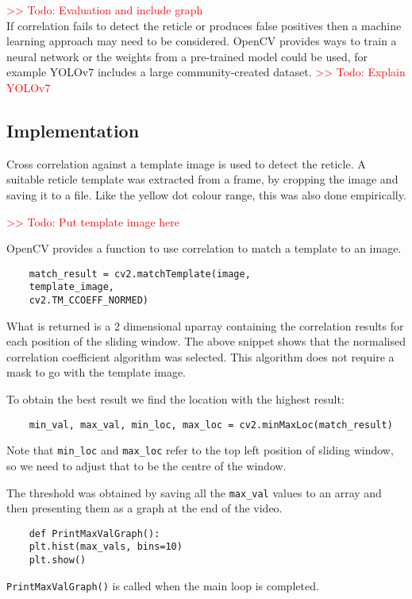 \documentclass[final]{cmpreport_02}
\begin{document}
\noindent
\textcolor{red}{>> Todo: Evaluation and include graph}\\
If correlation fails to detect the reticle or produces false positives then a machine learning approach may need to be considered. OpenCV provides ways to train a neural network or the weights from a pre-trained model could be used, for example YOLOv7 includes a large community-created dataset. \textcolor{red}{>> Todo: Explain YOLOv7}

\subsection{Implementation}

Cross correlation against a template image is used to detect the reticle. A suitable reticle template was extracted from a frame, by cropping the image and saving it to a file. Like the yellow dot colour range, this was also done empirically.

\noindent
\textcolor{red}{>> Todo: Put template image here}\noindent

OpenCV provides a function to use correlation to match a template to an image.
\begin{verbatim}
	match_result = cv2.matchTemplate(image,
	template_image,
	cv2.TM_CCOEFF_NORMED)
\end{verbatim}

What is returned is a 2 dimensional nparray containing the correlation results for each position of the sliding window. The above snippet shows that the normalised correlation coefficient algorithm was selected. This algorithm does not require a mask to go with the template image.

To obtain the best result we find the location with the highest result:
\begin{verbatim}
	min_val, max_val, min_loc, max_loc = cv2.minMaxLoc(match_result)
\end{verbatim}

Note that \verb|min_loc| and \verb|max_loc| refer to the top left position of sliding window, so we need to adjust that to be the centre of the window.

The threshold was obtained by saving all the \verb|max_val| values to an array and then presenting them as a graph at the end of the video.
\begin{verbatim}
	def PrintMaxValGraph():
	plt.hist(max_vals, bins=10)
	plt.show()
\end{verbatim}
\noindent
\verb|PrintMaxValGraph()| is called when the main loop is completed.
\end{document}
